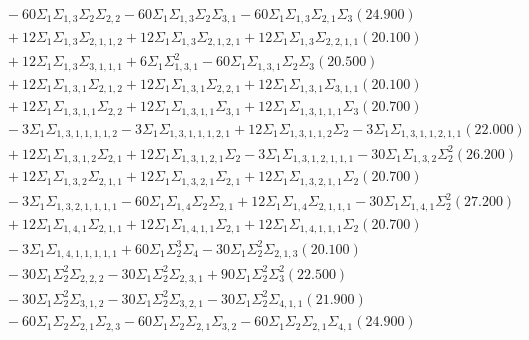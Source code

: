 \documentclass[12pt]{article}
\begin{document}
\begin{landscape}
\begin{align*}
		&\quad\quad -60\Sigma_{1}\Sigma_{1,3}\Sigma_{2}\Sigma_{2,2}-60\Sigma_{1}\Sigma_{1,3}\Sigma_{2}\Sigma_{3,1}-60\Sigma_{1}\Sigma_{1,3}\Sigma_{2,1}\Sigma_{3}(24.900) \\ 
		&\quad\quad +12\Sigma_{1}\Sigma_{1,3}\Sigma_{2,1,1,2}+12\Sigma_{1}\Sigma_{1,3}\Sigma_{2,1,2,1}+12\Sigma_{1}\Sigma_{1,3}\Sigma_{2,2,1,1}(20.100) \\ 
		&\quad\quad +12\Sigma_{1}\Sigma_{1,3}\Sigma_{3,1,1,1}+6\Sigma_{1}\Sigma_{1,3,1}^{2}-60\Sigma_{1}\Sigma_{1,3,1}\Sigma_{2}\Sigma_{3}(20.500) \\ 
		&\quad\quad +12\Sigma_{1}\Sigma_{1,3,1}\Sigma_{2,1,2}+12\Sigma_{1}\Sigma_{1,3,1}\Sigma_{2,2,1}+12\Sigma_{1}\Sigma_{1,3,1}\Sigma_{3,1,1}(20.100) \\ 
		&\quad\quad +12\Sigma_{1}\Sigma_{1,3,1,1}\Sigma_{2,2}+12\Sigma_{1}\Sigma_{1,3,1,1}\Sigma_{3,1}+12\Sigma_{1}\Sigma_{1,3,1,1,1}\Sigma_{3}(20.700) \\ 
		&\quad\quad -3\Sigma_{1}\Sigma_{1,3,1,1,1,1,2}-3\Sigma_{1}\Sigma_{1,3,1,1,1,2,1}+12\Sigma_{1}\Sigma_{1,3,1,1,2}\Sigma_{2}-3\Sigma_{1}\Sigma_{1,3,1,1,2,1,1}(22.000) \\ 
		&\quad\quad +12\Sigma_{1}\Sigma_{1,3,1,2}\Sigma_{2,1}+12\Sigma_{1}\Sigma_{1,3,1,2,1}\Sigma_{2}-3\Sigma_{1}\Sigma_{1,3,1,2,1,1,1}-30\Sigma_{1}\Sigma_{1,3,2}\Sigma_{2}^{2}(26.200) \\ 
		&\quad\quad +12\Sigma_{1}\Sigma_{1,3,2}\Sigma_{2,1,1}+12\Sigma_{1}\Sigma_{1,3,2,1}\Sigma_{2,1}+12\Sigma_{1}\Sigma_{1,3,2,1,1}\Sigma_{2}(20.700) \\ 
		&\quad\quad -3\Sigma_{1}\Sigma_{1,3,2,1,1,1,1}-60\Sigma_{1}\Sigma_{1,4}\Sigma_{2}\Sigma_{2,1}+12\Sigma_{1}\Sigma_{1,4}\Sigma_{2,1,1,1}-30\Sigma_{1}\Sigma_{1,4,1}\Sigma_{2}^{2}(27.200) \\ 
		&\quad\quad +12\Sigma_{1}\Sigma_{1,4,1}\Sigma_{2,1,1}+12\Sigma_{1}\Sigma_{1,4,1,1}\Sigma_{2,1}+12\Sigma_{1}\Sigma_{1,4,1,1,1}\Sigma_{2}(20.700) \\ 
		&\quad\quad -3\Sigma_{1}\Sigma_{1,4,1,1,1,1,1}+60\Sigma_{1}\Sigma_{2}^{3}\Sigma_{4}-30\Sigma_{1}\Sigma_{2}^{2}\Sigma_{2,1,3}(20.100) \\ 
		&\quad\quad -30\Sigma_{1}\Sigma_{2}^{2}\Sigma_{2,2,2}-30\Sigma_{1}\Sigma_{2}^{2}\Sigma_{2,3,1}+90\Sigma_{1}\Sigma_{2}^{2}\Sigma_{3}^{2}(22.500) \\ 
		&\quad\quad -30\Sigma_{1}\Sigma_{2}^{2}\Sigma_{3,1,2}-30\Sigma_{1}\Sigma_{2}^{2}\Sigma_{3,2,1}-30\Sigma_{1}\Sigma_{2}^{2}\Sigma_{4,1,1}(21.900) \\ 
		&\quad\quad -60\Sigma_{1}\Sigma_{2}\Sigma_{2,1}\Sigma_{2,3}-60\Sigma_{1}\Sigma_{2}\Sigma_{2,1}\Sigma_{3,2}-60\Sigma_{1}\Sigma_{2}\Sigma_{2,1}\Sigma_{4,1}(24.900) \\ 

\end{align*}
\end{landscape}
\end{document}
